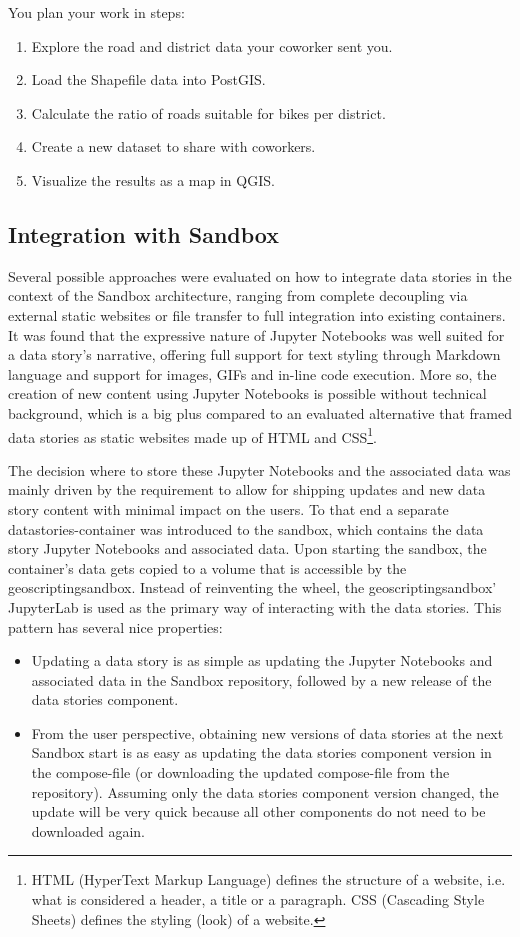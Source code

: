 \documentclass[11pt, a4paper, oneside, parskip=full-]{scrartcl}
\begin{document}
You plan your work in steps:
\begin{enumerate}
  \item Explore the road and district data your coworker sent you.
  \item Load the Shapefile data into PostGIS.
  \item Calculate the ratio of roads suitable for bikes per district.
  \item Create a new dataset to share with coworkers.
  \item Visualize the results as a map in QGIS.
\end{enumerate}

\subsection{Integration with Sandbox}
Several possible approaches were evaluated on how to integrate data stories in
the context of the Sandbox architecture, ranging from complete decoupling via
external static websites or file transfer to full integration into existing
containers. It was found that the expressive nature of Jupyter Notebooks was
well suited for a data story's narrative, offering full support for text styling
through Markdown language and support for images, GIFs and in-line code
execution. More so, the creation of new content using Jupyter Notebooks is
possible without technical background, which is a big plus compared to an
evaluated alternative that framed data stories as static websites made up of
HTML and CSS\footnote{HTML (HyperText Markup Language) defines the structure of
a website, i.e. what is considered a header, a title or a paragraph. CSS
(Cascading Style Sheets) defines the styling (look) of a website.}.

The decision where to store these Jupyter Notebooks and the associated data was
mainly driven by the requirement to allow for shipping updates and new data
story content with minimal impact on the users. To that end a separate
datastories-container was introduced to the sandbox, which contains the data
story Jupyter Notebooks and associated data. Upon starting the sandbox, the
container's data gets copied to a volume that is accessible by the
geoscriptingsandbox. Instead of reinventing the wheel, the geoscriptingsandbox'
JupyterLab is used as the primary way of interacting with the data stories. This
pattern has several nice properties:
\begin{itemize}
  \item Updating a data story is as simple as updating the Jupyter Notebooks and
  associated data in the Sandbox repository, followed by a new release of the
  data stories component.
  \item From the user perspective, obtaining new versions of data stories at the
  next Sandbox start is as easy as updating the data stories component version
  in the compose-file (or downloading the updated compose-file from the
  repository). Assuming only the data stories component version changed, the
  update will be very quick because all other components do not need to be
  downloaded again.
\end{itemize}
\end{document}
